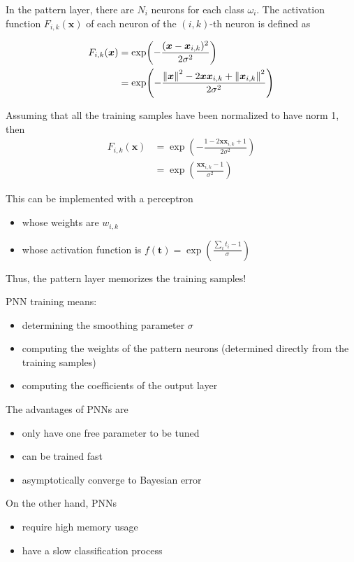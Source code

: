 \documentclass[oneside,onecolumn]{report}
\begin{document}
In the pattern layer, there are $N_i$ neurons for each class $\omega_i$.
The activation function $F_{i,k}(\bm x)$ of each neuron of the $(i, k)$-th neuron is defined as

\begin{align*}
    F_{i,k}(\bm x)
    &= \exp(-\frac{(\bm x - \bm x_{i,k})^2}{2 \sigma^2}) \\
    &= \exp(-\frac{\norm{\bm x}^2 - 2 \bm x \bm x_{i,k} + \norm{\bm x_{i,k}}^2}{2 \sigma^2})
\end{align*}

Assuming that all the training samples have been normalized to have norm 1, then
\begin{align*}
F_{i,k}(\bm x)
    &= \exp(-\frac{1 - 2 \bm x \bm x_{i,k} + 1}{2 \sigma^2}) \\
    &= \exp(\frac{\bm x \bm x_{i,k} - 1}{ \sigma^2})
\end{align*}

This can be implemented with a perceptron
\begin{itemize}
    \item whose weights are $w_{i,k}$
    \item whose activation function is $f(\bm t) = \exp(\frac{\sum_i t_i - 1}{\sigma})$
\end{itemize}

Thus, the pattern layer memorizes the training samples!

PNN training means:
\begin{itemize}
    \item determining the smoothing parameter $\sigma$
    \item computing the weights of the pattern neurons (determined directly from the training samples)
    \item computing the coefficients of the output layer
\end{itemize}

The advantages of PNNs are
\begin{itemize}
    \item only have one free parameter to be tuned
    \item can be trained fast
    \item asymptotically converge to Bayesian error
\end{itemize}

On the other hand, PNNs
\begin{itemize}
    \item require high memory usage
    \item have a slow classification process
\end{itemize}
\end{document}
